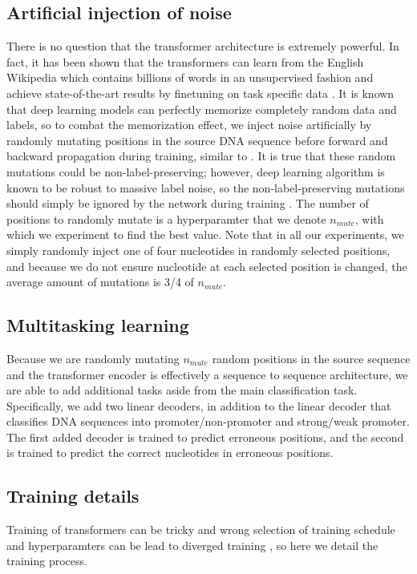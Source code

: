 \documentclass{article}
\begin{document}
\subsection{Artificial injection of noise}
There is no question that the transformer architecture is extremely powerful. In fact, it has been shown that the transformers can learn from the English Wikipedia which contains billions of words in an unsupervised fashion and achieve state-of-the-art results by finetuning on task specific data \cite{bert_paper}. It is known that deep learning models can perfectly memorize completely random data and labels, so to combat the memorization effect, we inject noise artificially by randomly mutating positions in the source DNA sequence before forward and backward propagation during training, similar to \cite{bert_paper}. It is true that these random mutations could be non-label-preserving; however, deep learning algorithm is known to be robust to massive label noise, so the non-label-preserving mutations should simply be ignored by the network during training \cite{RolnickVBS17}. The number of positions to randomly mutate is a hyperparamter that we denote $n_{mute}$, with which we experiment to find the best value. Note that in all our experiments, we simply randomly inject one of four nucleotides in randomly selected positions, and because we do not ensure nucleotide at each selected position is changed, the average amount of mutations is 3/4 of $n_{mute}$. 

\subsection{Multitasking learning}
Because we are randomly mutating $n_{mute}$ random positions in the source sequence and the transformer encoder is effectively a sequence to sequence  architecture, we are able to add additional tasks aside from the main classification task. Specifically, we add two linear decoders, in addition to the linear decoder that classifies DNA sequences into promoter/non-promoter and strong/weak promoter. The first added decoder is trained to predict erroneous positions, and the second is trained to predict the correct nucleotides in erroneous positions. 


\subsection{Training details}
Training of transformers can be tricky and wrong selection of training schedule and hyperparamters can be lead to diverged training \cite{trainingtipstransformers}, so here we detail the training process.
\end{document}
